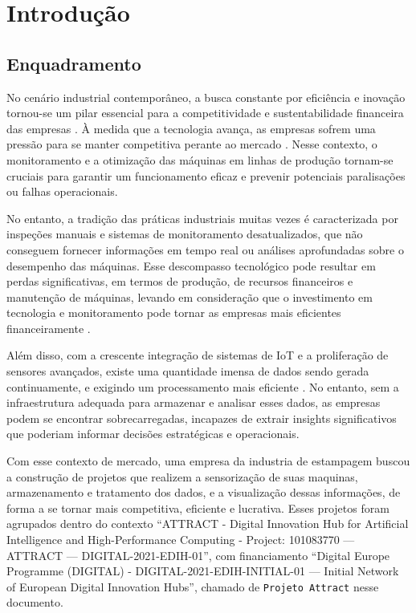 \chapter{Introdução}\label{cap:intro}

\section{Enquadramento}

No cenário industrial contemporâneo, a busca constante por eficiência e inovação tornou-se um pilar essencial para a competitividade e sustentabilidade financeira das empresas \cite{Bonilla2018}. À medida que a tecnologia avança, as empresas sofrem uma pressão para se manter competitiva perante ao mercado \cite{ashraf2020optimization}. Nesse contexto, o monitoramento e a otimização das máquinas em linhas de produção tornam-se cruciais para garantir um funcionamento eficaz e prevenir potenciais paralisações ou falhas operacionais.

No entanto, a tradição das práticas industriais muitas vezes é caracterizada por inspeções manuais e sistemas de monitoramento desatualizados, que não conseguem fornecer informações em tempo real ou análises aprofundadas sobre o desempenho das máquinas. Esse descompasso tecnológico pode resultar em perdas significativas, em termos de produção, de recursos financeiros e manutenção de máquinas, levando em consideração que o investimento em tecnologia e monitoramento pode tornar as empresas mais eficientes financeiramente \cite{mabad2021rfid}.

Além disso, com a crescente integração de sistemas de IoT e a proliferação de sensores avançados, existe uma quantidade imensa de dados sendo gerada continuamente, e exigindo um processamento mais eficiente \cite{bajaj2021iot}. No entanto, sem a infraestrutura adequada para armazenar e analisar esses dados, as empresas podem se encontrar sobrecarregadas, incapazes de extrair insights significativos que poderiam informar decisões estratégicas e operacionais.

Com esse contexto de mercado, uma empresa da industria de estampagem buscou a construção de projetos que realizem a sensorização de suas maquinas, armazenamento e tratamento dos dados, e a visualização dessas informações, de forma a se tornar mais competitiva, eficiente e lucrativa. Esses projetos foram agrupados dentro do contexto “ATTRACT - Digital Innovation Hub for Artificial Intelligence and High-Performance Computing - Project: 101083770 — ATTRACT — DIGITAL-2021-EDIH-01”, com financiamento “Digital Europe Programme (DIGITAL) - DIGITAL-2021-EDIH-INITIAL-01 — Initial Network of European Digital Innovation Hubs”, chamado de \texttt{Projeto Attract} nesse documento.

